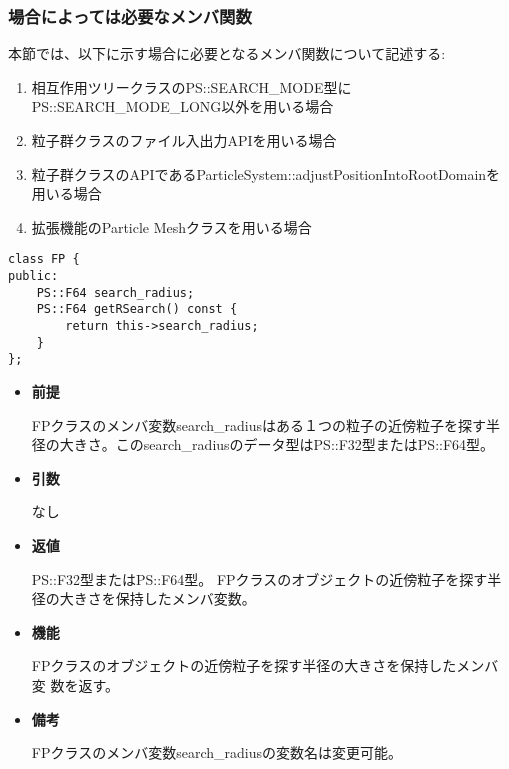 \subsubsection{場合によっては必要なメンバ関数}


本節では、以下に示す場合に必要となるメンバ関数について記述する:
\begin{enumerate}%
\item 相互作用ツリークラスのPS::SEARCH\_MODE型にPS::SEARCH\_MODE\_LONG以外を用いる場合
\item 粒子群クラスのファイル入出力APIを用いる場合
\item 粒子群クラスのAPIであるParticleSystem::adjustPositionIntoRootDomainを用いる場合
\item 拡張機能のParticle Meshクラスを用いる場合
\end{enumerate}



\begin{screen}
\begin{verbatim}
class FP {
public:
    PS::F64 search_radius;
    PS::F64 getRSearch() const {
        return this->search_radius;
    }
};
\end{verbatim}
\end{screen}

\begin{itemize}

\item {\bf 前提}

  FPクラスのメンバ変数search\_radiusはある１つの粒子の近傍粒子を探す半
  径の大きさ。このsearch\_radiusのデータ型はPS::F32型またはPS::F64型。
  
\item {\bf 引数}

  なし
  
\item {\bf 返値}

  PS::F32型またはPS::F64型。 FPクラスのオブジェクトの近傍粒子を探す半
  径の大きさを保持したメンバ変数。
  
\item {\bf 機能}

  FPクラスのオブジェクトの近傍粒子を探す半径の大きさを保持したメンバ変
  数を返す。

\item {\bf 備考}

  FPクラスのメンバ変数search\_radiusの変数名は変更可能。
  
\end{itemize}
\fi

